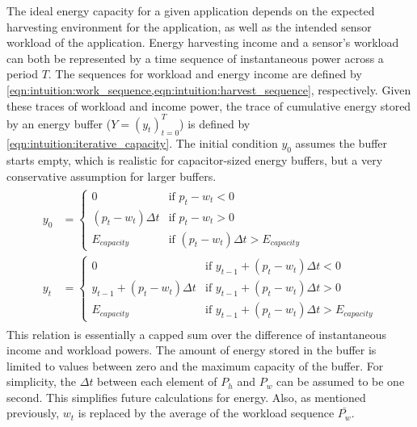 The ideal energy capacity for a given application depends on the 
expected harvesting environment for the application,
as well as the 
intended sensor workload of the application. 
Energy harvesting income and a sensor's workload can both be represented by a time sequence of instantaneous power across a period $T$.
The sequences for workload and energy income are defined by \cref{eqn:intuition:work_sequence,eqn:intuition:harvest_sequence}, respectively.
Given these traces of workload and income power, the trace of cumulative energy stored by an energy buffer ($Y = (y_t)^T_{t=0}$) is defined by \cref{eqn:intuition:iterative_capacity}. The initial condition $y_0$ assumes the buffer starts empty, which is realistic for capacitor-sized energy buffers, but a very conservative assumption for larger buffers. 
\begin{align}
\begin{split}
    y_0 &= \begin{cases} 
        0                       & \text{if $p_t - w_t < 0$} \\
        (p_t - w_t) \Delta t    & \text{if $p_t - w_t > 0$} \\
        E_{capacity}            & \text{if $(p_t - w_t) \Delta t > E_{capacity}$}
    \end{cases} \\
    y_t &= \begin{cases} 
        0                               & \text{if $y_{t-1} + (p_t - w_t) \Delta t < 0$} \\
        y_{t-1} + (p_t - w_t) \Delta t  & \text{if $y_{t-1} + (p_t - w_t) \Delta t > 0$} \\
        E_{capacity}                    & \text{if $y_{t-1} + (p_t - w_t) \Delta t > E_{capacity}$}
    \end{cases}
    \end{split} \label{eqn:intuition:iterative_capacity} 
\end{align}
This relation is essentially a capped sum over the difference of instantaneous income and workload powers. The amount of energy stored in the buffer is limited to values between zero and the maximum capacity of the buffer. 
For simplicity, the $\Delta t$ between each element of $P_h$ and $P_w$ can be assumed to be one second. This simplifies future calculations for energy. Also, as mentioned previously, $w_t$ is replaced by the average of the workload sequence $\bar{P_w}$.

